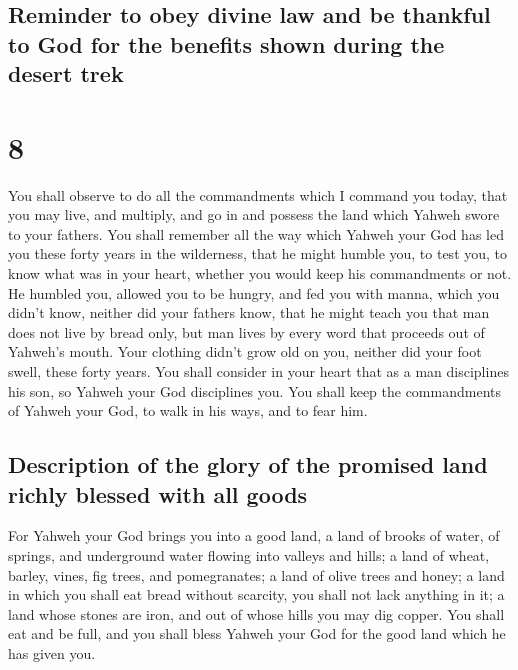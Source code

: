 \begin{paracol}{2}
\switchcolumn
\begin{otherlanguage}{english}

\hypertarget{reminder-to-obey-divine-law-and-be-thankful-to-god-for-the-benefits-shown-during-the-desert-trek}{%
\subsection{Reminder to obey divine law and be thankful to God for the
benefits shown during the desert
trek}\label{reminder-to-obey-divine-law-and-be-thankful-to-god-for-the-benefits-shown-during-the-desert-trek}}

\hypertarget{section-15}{%
\section{8}\label{section-15}}

 You shall observe to do all the commandments which I
command you today, that you may live, and multiply, and go in and
possess the land which Yahweh swore to your fathers.  You
shall remember all the way which Yahweh your God has led you these forty
years in the wilderness, that he might humble you, to test you, to know
what was in your heart, whether you would keep his commandments or not.
 He humbled you, allowed you to be hungry, and fed you
with manna, which you didn't know, neither did your fathers know, that
he might teach you that man does not live by bread only, but man lives
by every word that proceeds out of Yahweh's mouth.  Your
clothing didn't grow old on you, neither did your foot swell, these
forty years.  You shall consider in your heart that as a
man disciplines his son, so Yahweh your God disciplines you.
 You shall keep the commandments of Yahweh your God, to
walk in his ways, and to fear him.

\hypertarget{description-of-the-glory-of-the-promised-land-richly-blessed-with-all-goods}{%
\subsection{Description of the glory of the promised land richly blessed
with all
goods}\label{description-of-the-glory-of-the-promised-land-richly-blessed-with-all-goods}}

 For Yahweh your God brings you into a good land, a land
of brooks of water, of springs, and underground water flowing into
valleys and hills;  a land of wheat, barley, vines, fig
trees, and pomegranates; a land of olive trees and honey; 
a land in which you shall eat bread without scarcity, you shall not lack
anything in it; a land whose stones are iron, and out of whose hills you
may dig copper.  You shall eat and be full, and you shall
bless Yahweh your God for the good land which he has given you.


\end{otherlanguage}
\end{paracol}
